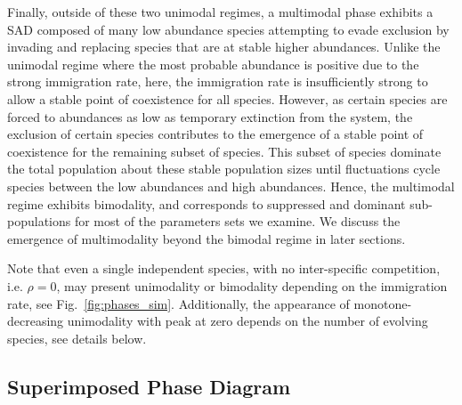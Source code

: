 \documentclass[9pt,lineno]{elife}
\begin{document}
Finally, outside of these two unimodal regimes, a multimodal phase exhibits a SAD composed of many low abundance species attempting to evade exclusion by invading and replacing species that are at stable higher abundances.
Unlike the unimodal regime where the most probable abundance is positive due to the strong immigration rate, %
here, the immigration rate is insufficiently strong to allow a stable point of coexistence for all species.
However, as certain species are forced to abundances as low as temporary extinction from the system, the exclusion of certain species contributes to the emergence of a stable point of coexistence for the remaining subset of species.
This subset of species dominate the total population about these stable population sizes until fluctuations cycle species between the low abundances and high abundances. Hence, the multimodal regime exhibits bimodality, and corresponds to suppressed and dominant sub-populations for most of the parameters sets we examine. 
We discuss the emergence of multimodality beyond the bimodal regime in later sections.   

Note that even a single independent species, with no inter-specific competition, i.e. $\rho=0$, may present unimodality or bimodality depending on the immigration rate, see Fig.~\ref{fig:phases_sim}. 
Additionally, the appearance of monotone-decreasing unimodality with peak at zero depends on the number of evolving species, see details below. 


\subsection{Superimposed Phase Diagram}
\end{document}
